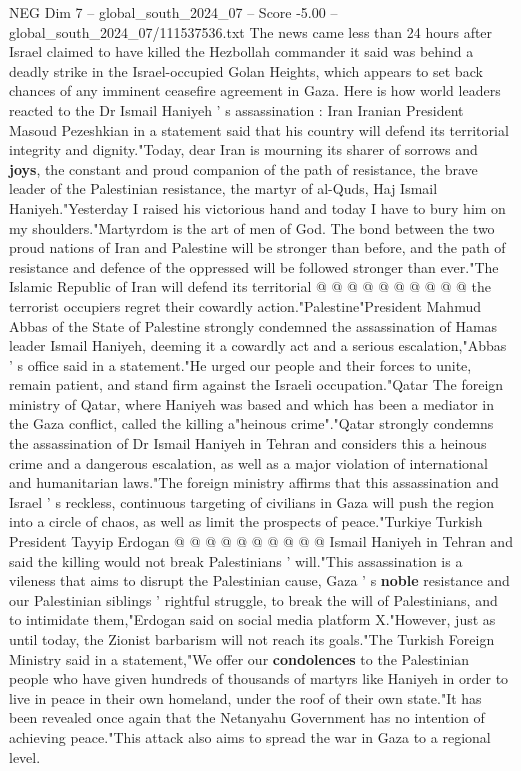 \begin{textsample}{NEG Dim 7 – global\_south\_2024\_07 – Score -5.00 – global\_south\_2024\_07/111537536.txt}  \label{ex:f7_neg_336}
The news came less than 24 hours after Israel claimed to have killed the Hezbollah commander it said was behind a deadly strike in the Israel-occupied Golan Heights, which appears to set back chances of any imminent ceasefire agreement in Gaza.
Here is how world leaders reacted to the Dr Ismail Haniyeh ' s assassination : Iran Iranian President Masoud Pezeshkian in a statement said that his country will defend its territorial integrity and dignity."Today, dear Iran is mourning its sharer of sorrows and \textbf{joys}, the constant and proud companion of the path of resistance, the brave leader of the Palestinian resistance, the martyr of al-Quds, Haj Ismail Haniyeh."Yesterday I raised his victorious hand and today I have to bury him on my shoulders."Martyrdom is the art of men of God.
The bond between the two proud nations of Iran and Palestine will be stronger than before, and the path of resistance and defence of the oppressed will be followed stronger than ever."The Islamic Republic of Iran will defend its territorial @ @ @ @ @ @ @ @ @ @ the terrorist occupiers regret their cowardly action."Palestine"President Mahmud Abbas of the State of Palestine strongly condemned the assassination of Hamas leader Ismail Haniyeh, deeming it a cowardly act and a serious escalation,"Abbas ' s office said in a statement."He urged our people and their forces to unite, remain patient, and stand firm against the Israeli occupation."Qatar The foreign ministry of Qatar, where Haniyeh was based and which has been a mediator in the Gaza conflict, called the killing a"heinous crime"."Qatar strongly condemns the assassination of Dr Ismail Haniyeh in Tehran and considers this a heinous crime and a dangerous escalation, as well as a major violation of international and humanitarian laws."The foreign ministry affirms that this assassination and Israel ' s reckless, continuous targeting of civilians in Gaza will push the region into a circle of chaos, as well as limit the prospects of peace."Turkiye Turkish President Tayyip Erdogan @ @ @ @ @ @ @ @ @ @ Ismail Haniyeh in Tehran and said the killing would not break Palestinians ' will."This assassination is a vileness that aims to disrupt the Palestinian cause, Gaza ' s \textbf{noble} resistance and our Palestinian siblings ' rightful struggle, to break the will of Palestinians, and to intimidate them,"Erdogan said on social media platform X."However, just as until today, the Zionist barbarism will not reach its goals."The Turkish Foreign Ministry said in a statement,"We offer our \textbf{condolences} to the Palestinian people who have given hundreds of thousands of martyrs like Haniyeh in order to live in peace in their own homeland, under the roof of their own state."It has been revealed once again that the Netanyahu Government has no intention of achieving peace."This attack also aims to spread the war in Gaza to a regional level.

\end{textsample}
